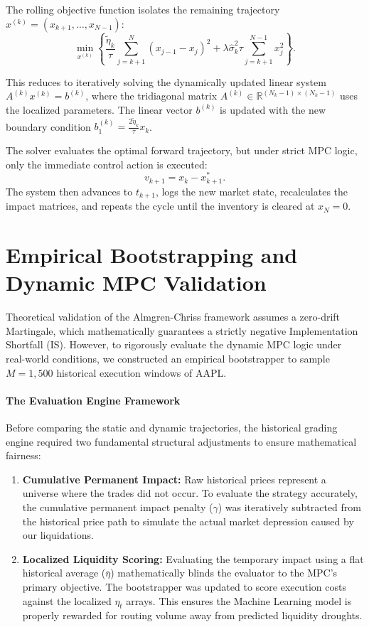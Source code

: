 \documentclass[11pt,a4paper]{article}
\begin{document}
The rolling objective function isolates the remaining trajectory $x^{(k)} = (x_{k+1}, \dots, x_{N-1})$:
\[ \min_{x^{(k)}} \left\{ \frac{\tilde{\eta}_k}{\tau} \sum_{j=k+1}^{N} (x_{j-1} - x_j)^2 + \lambda \hat{\sigma}_k^2 \tau \sum_{j=k+1}^{N-1} x_j^2 \right\}. \]

This reduces to iteratively solving the dynamically updated linear system $A^{(k)} x^{(k)} = b^{(k)}$, where the tridiagonal matrix $A^{(k)} \in \mathbb{R}^{(N_k-1) \times (N_k-1)}$ uses the localized parameters. The linear vector $b^{(k)}$ is updated with the new boundary condition $b^{(k)}_1 = \frac{2\tilde{\eta}_k}{\tau} x_k$. 

The solver evaluates the optimal forward trajectory, but under strict MPC logic, only the immediate control action is executed:
\[ v_{k+1} = x_k - x^*_{k+1}. \]
The system then advances to $t_{k+1}$, logs the new market state, recalculates the impact matrices, and repeats the cycle until the inventory is cleared at $x_N = 0$.

\section{Empirical Bootstrapping and Dynamic MPC Validation}

Theoretical validation of the Almgren-Chriss framework assumes a zero-drift Martingale, which mathematically guarantees a strictly negative Implementation Shortfall (IS). However, to rigorously evaluate the dynamic MPC logic under real-world conditions, we constructed an empirical bootstrapper to sample $M=1,500$ historical execution windows of AAPL.

\paragraph{The Evaluation Engine Framework}
Before comparing the static and dynamic trajectories, the historical grading engine required two fundamental structural adjustments to ensure mathematical fairness:
\begin{enumerate}
    \item \textbf{Cumulative Permanent Impact:} Raw historical prices represent a universe where the trades did not occur. To evaluate the strategy accurately, the cumulative permanent impact penalty ($\gamma$) was iteratively subtracted from the historical price path to simulate the actual market depression caused by our liquidations.
    \item \textbf{Localized Liquidity Scoring:} Evaluating the temporary impact using a flat historical average ($\bar{\eta}$) mathematically blinds the evaluator to the MPC's primary objective. The bootstrapper was updated to score execution costs against the localized $\eta_t$ arrays. This ensures the Machine Learning model is properly rewarded for routing volume away from predicted liquidity droughts.
\end{enumerate}
\end{document}
